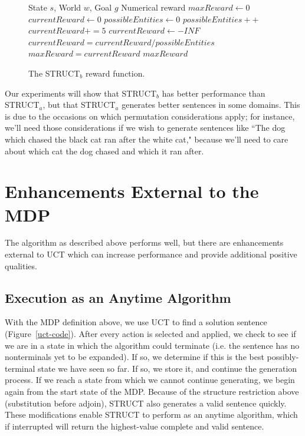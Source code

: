 \begin{figure}
\caption{The STRUCT$_b$ reward function.}\label{struct-b}
\begin{algorithmic}[1]
\REQUIRE State $s$, World $w$, Goal $g$
\ENSURE Numerical reward
\STATE $maxReward \gets 0$
	\STATE $currentReward \gets 0$
	\STATE $possibleEntities \gets 0$
			\STATE $possibleEntities++$
		\ENDIF
			\STATE $currentReward += 5$
		\ENDIF
		\ENDFOR
	\ENDFOR
		\STATE $currentReward \gets -INF$
	\ELSE
		\STATE $currentReward = currentReward / possibleEntities$
	\ENDIF
		\STATE $maxReward = currentReward$
	\ENDIF
\ENDFOR
\RETURN $maxReward$
\end{algorithmic}
\end{figure}

Our experiments will show that STRUCT$_b$
has better performance than STRUCT$_a$, but that STRUCT$_a$ generates better
sentences in some domains.  This is due to the occasions on which
permutation considerations apply; for instance, we'll need those considerations
if we wish to generate sentences like ``The dog which chased the black cat ran
after the white cat," because we'll need to care about which cat the dog
chased and which it ran after.

\section{Enhancements External to the MDP}

The algorithm as described above performs well, but there are enhancements
external to UCT which can increase performance and provide additional
positive qualities.

\subsection{Execution as an Anytime Algorithm}
 With the MDP definition above, we use UCT to find a solution sentence
 (Figure~\ref{uct-code}). After every action is
 selected and applied, we check to see if we are in a state in which
 the algorithm could terminate (i.e. the sentence has no nonterminals
 yet to be expanded).  If so, we determine if this is the best
 possibly-terminal state we have seen so far.  If so, we store it, and
 continue the generation process. If we reach a state from which we
 cannot continue generating, we begin again from the start state of
 the MDP. Because of the structure restriction above (substitution
 before adjoin), STRUCT also generates a valid sentence quickly. These
 modifications enable STRUCT to perform as an anytime algorithm, which
 if interrupted will return the highest-value complete and valid
 sentence.

